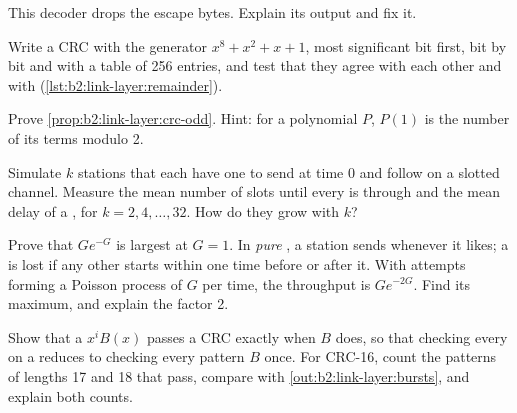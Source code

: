\begin{exercise}[$\star\star$]\label{exo:b2:link-layer:6}
This decoder drops the escape bytes. Explain its output and fix it.
\end{exercise}

\begin{exercise}[$\star\star$]\label{exo:b2:link-layer:7}
Write a CRC with the generator $x^8 + x^2 + x + 1$, most significant bit first, bit by bit and with a table of 256
entries, and test that they agree with each other and with  (\cref{lst:b2:link-layer:remainder}).
\end{exercise}

\begin{exercise}[$\star\star$]\label{exo:b2:link-layer:8}
Prove \cref{prop:b2:link-layer:crc-odd}. Hint: for a polynomial $P$, $P(1)$ is the number of its terms modulo 2.
\end{exercise}

\begin{exercise}[$\star\star$]\label{exo:b2:link-layer:9}
Simulate $k$ stations that each have one  to send at time 0 and follow  on a slotted
channel. Measure the mean number of slots until every  is through and the mean delay of a , for $k = 2, 4,
\dots, 32$. How do they grow with $k$?
\end{exercise}

\begin{exercise}[$\star\star\star$]\label{exo:b2:link-layer:10}
Prove that $G e^{-G}$ is largest at $G = 1$. In \emph{pure} , a station sends whenever it likes; a  is lost
if any other  starts within one  time before or after it. With attempts forming a Poisson process of $G$
 per  time, the throughput is $G e^{-2G}$. Find its maximum, and explain the factor 2.
\end{exercise}

\begin{exercise}[$\star\star\star$]\label{exo:b2:link-layer:11}
Show that a  $x^i B(x)$ passes a CRC exactly when $B$ does, so that checking every  on a  reduces to
checking every pattern $B$ once. For CRC-16, count the patterns of lengths 17 and 18 that pass, compare with
\cref{out:b2:link-layer:bursts}, and explain both counts.
\end{exercise}

